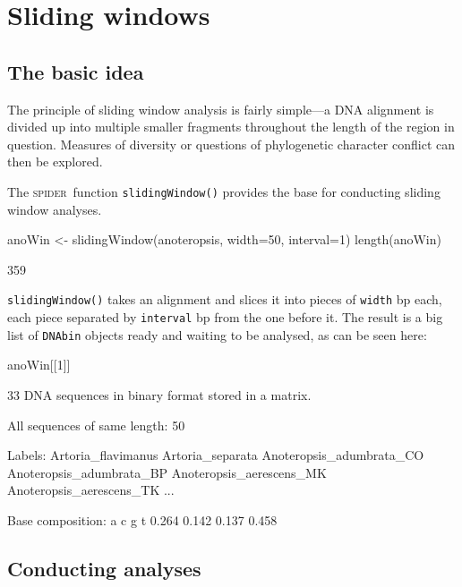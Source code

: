 \documentclass{article}
\newcommand{\spider}{\textsc{spider}~} %
\newcommand{\fun}[1]{\texttt{#1}}
\begin{document}

\section{Sliding windows}

\subsection{The basic idea}
The principle of sliding window analysis is fairly simple---a DNA alignment is divided up into multiple smaller fragments throughout the length of the region in question. Measures of diversity \citep{Roe.Sper.2007} or questions of phylogenetic character conflict \citep{Crui.2011} can then be explored.

The \spider function \fun{slidingWindow()} provides the base for conducting sliding window analyses. 

\begin{console}
anoWin <- slidingWindow(anoteropsis, width=50, interval=1)
length(anoWin)
\end{console}

\begin{Routput}
[1] 359
\end{Routput}

\fun{slidingWindow()} takes an alignment and slices it into pieces of \fun{width} bp each, each piece separated by \fun{interval} bp from the one before it. The result is a big list of \fun{DNAbin} objects ready and waiting to be analysed, as can be seen here:

\begin{console}
anoWin[[1]]
\end{console}

\begin{Routput}
33 DNA sequences in binary format stored in a matrix.

All sequences of same length: 50 

Labels: Artoria_flavimanus Artoria_separata Anoteropsis_adumbrata_CO 
Anoteropsis_adumbrata_BP Anoteropsis_aerescens_MK Anoteropsis_aerescens_TK ...

Base composition:
    a     c     g     t 
0.264 0.142 0.137 0.458 
\end{Routput}

\subsection{Conducting analyses}
\end{document}
